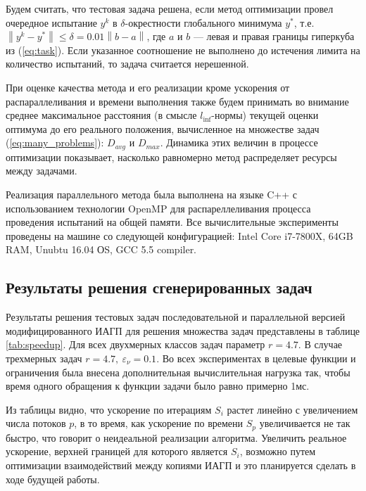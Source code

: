 Будем считать, что тестовая задача решена, если метод оптимизации провел очередное испытание \(y^k\) в
\(\delta\)-окрестности глобального минимума \(y^*\), т.е. $\left\|y^k-
y^*\right\|\leqslant \delta = 0.01\left\|b-a\right\|$, где \(a\) и \(b\) --- левая и правая границы гиперкуба из (\ref{eq:task}).
Если указанное соотношение не выполнено до истечения лимита на количество испытаний, то задача считается нерешенной.

При оценке качества метода и его реализации кроме ускорения от распараллеливания и времени выполнения также будем принимать во внимание среднее максимальное расстояния (в смысле \(l_{\inf}\)-нормы) текущей оценки оптимума до его реального положения,
вычисленное на множестве задач (\ref{eq:many_problems}): \(D_{avg}\) и \(D_{max}\). Динамика этих величин в процессе оптимизации
показывает, насколько равномерно метод распределяет ресурсы между задачами.

Реализация параллельного метода была выполнена на языке C++ с использованием технологии OpenMP
для распареллеливания процесса проведения испытаний на общей памяти. Все вычислительные
эксперименты проведены на машине со следующей конфигурацией: Intel Core i7-7800X, 64GB RAM, Unubtu 16.04 ОS, GCC 5.5 compiler.

\subsection{Результаты решения сгенерированных задач}

Результаты решения тестовых задач последовательной и параллельной версией модифицированного ИАГП
для решения множества задач представлены в таблице \ref{tab:speedup}. Для всех двухмерных классов задач параметр \(r=4.7\).
В случае трехмерных задач \(r=4.7,\: \varepsilon_\nu=0.1\).
Во всех экспериментах в целевые функции и ограничения была внесена дополнительная вычислительная нагрузка так,
чтобы время одного обращения к функции задачи было равно примерно 1мс.

Из таблицы видно, что ускорение по итерациям \(S_i\) растет линейно с увеличением числа потоков \(p\),
в то время, как ускорение по времени \(S_p\) увеличивается не так быстро, что говорит о неидеальной
реализации алгоритма. Увеличить реальное ускорение, верхней границей для которого является
\(S_i\), возможно путем оптимизации взаимодействий между копиями ИАГП и это планируется сделать в ходе будущей работы.

